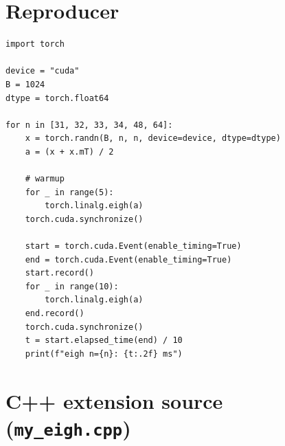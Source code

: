 \documentclass[10pt, letterpaper]{article}
\begin{document}
\section{Reproducer}
\label{app:reproducer}

\begin{lstlisting}[style=python]
import torch

device = "cuda"
B = 1024
dtype = torch.float64

for n in [31, 32, 33, 34, 48, 64]:
    x = torch.randn(B, n, n, device=device, dtype=dtype)
    a = (x + x.mT) / 2

    # warmup
    for _ in range(5):
        torch.linalg.eigh(a)
    torch.cuda.synchronize()

    start = torch.cuda.Event(enable_timing=True)
    end = torch.cuda.Event(enable_timing=True)
    start.record()
    for _ in range(10):
        torch.linalg.eigh(a)
    end.record()
    torch.cuda.synchronize()
    t = start.elapsed_time(end) / 10
    print(f"eigh n={n}: {t:.2f} ms")
\end{lstlisting}


\section{C++ extension source (\texttt{my\_eigh.cpp})}
\label{app:extension}
\end{document}
